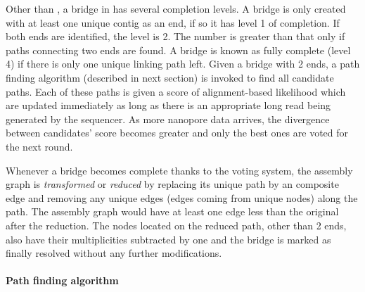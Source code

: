 Other than \npscarf{}, a bridge in \npgraph{} has several completion levels. A bridge is only created with at least one unique contig as an end, if so it has level 1 of completion. If both ends are identified, the level is 2. The number is greater than that only if paths connecting two ends are found. A bridge is known as fully complete (level 4) if there is only one unique linking path left. Given a bridge with 2 ends, a path finding algorithm (described in next section) is invoked to find all candidate paths. Each of these paths is given a score of alignment-based likelihood which are updated immediately as long as there is an appropriate long read being generated by the sequencer. As more nanopore data arrives, the divergence between candidates' score becomes greater and only the best ones are voted for the next round.

Whenever a bridge becomes complete thanks to the voting system, the assembly graph is \emph{transformed} or \emph{reduced} by replacing its unique path by an composite edge and removing any unique edges (edges coming from unique nodes) along the path. The assembly graph would have at least one edge less than the original after the reduction. The nodes located on the reduced path, other than 2 ends, also have their multiplicities subtracted by one and the bridge is marked as finally resolved without any further modifications. 
\paragraph{Path finding algorithm}

